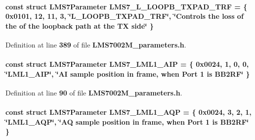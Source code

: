 \paragraph[{L\+M\+S7\+\_\+\+L\+\_\+\+L\+O\+O\+P\+B\+\_\+\+T\+X\+P\+A\+D\+\_\+\+T\+RF}]{\setlength{\rightskip}{0pt plus 5cm}const struct {\bf L\+M\+S7\+Parameter} L\+M\+S7\+\_\+\+L\+\_\+\+L\+O\+O\+P\+B\+\_\+\+T\+X\+P\+A\+D\+\_\+\+T\+RF = \{ 0x0101, 12, 11, 3, \char`\"{}\+L\+\_\+\+L\+O\+O\+P\+B\+\_\+\+T\+X\+P\+A\+D\+\_\+\+T\+R\+F\char`\"{}, \char`\"{}\+Controls the loss of the of the loopback path at the T\+X side\char`\"{} \}\hspace{0.3cm}{\ttfamily [static]}}\label{LMS7002M__parameters_8h_ac747bb3dc245b3b9152afbe8e6b8d670}


Definition at line {\bf 389} of file {\bf L\+M\+S7002\+M\+\_\+parameters.\+h}.

\paragraph[{L\+M\+S7\+\_\+\+L\+M\+L1\+\_\+\+A\+IP}]{\setlength{\rightskip}{0pt plus 5cm}const struct {\bf L\+M\+S7\+Parameter} L\+M\+S7\+\_\+\+L\+M\+L1\+\_\+\+A\+IP = \{ 0x0024, 1, 0, 0, \char`\"{}\+L\+M\+L1\+\_\+\+A\+I\+P\char`\"{}, \char`\"{}\+A\+I sample position in frame, when Port 1 is B\+B2\+R\+F\char`\"{} \}\hspace{0.3cm}{\ttfamily [static]}}\label{LMS7002M__parameters_8h_acf80d7f250bb836223fb2aebb503b953}


Definition at line {\bf 90} of file {\bf L\+M\+S7002\+M\+\_\+parameters.\+h}.

\paragraph[{L\+M\+S7\+\_\+\+L\+M\+L1\+\_\+\+A\+QP}]{\setlength{\rightskip}{0pt plus 5cm}const struct {\bf L\+M\+S7\+Parameter} L\+M\+S7\+\_\+\+L\+M\+L1\+\_\+\+A\+QP = \{ 0x0024, 3, 2, 1, \char`\"{}\+L\+M\+L1\+\_\+\+A\+Q\+P\char`\"{}, \char`\"{}\+A\+Q sample position in frame, when Port 1 is B\+B2\+R\+F\char`\"{} \}\hspace{0.3cm}{\ttfamily [static]}}\label{LMS7002M__parameters_8h_a33311b1fe63f4a53fc45d6363820d2e0}


